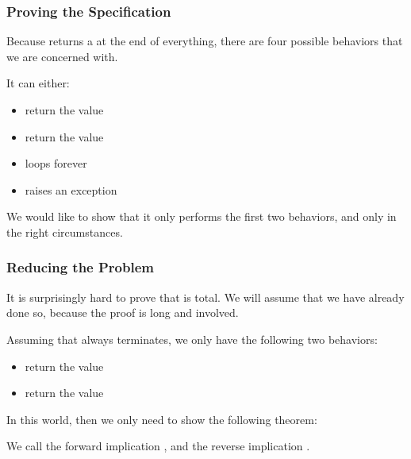 \documentclass[aspectratio=169, handout]{beamer}
\begin{document}
\begin{frame}[fragile]
  \frametitle{Proving the Specification}

  Because  returns a  at the end of everything, there
  are four possible behaviors that we are concerned with.

  \pause
  \vspace{\fill}

  It can either:
  \begin{itemize}
    \item return the value 
    \item return the value 
    \item loops forever
    \item raises an exception
  \end{itemize}

  \pause
  \vspace{\fill}

  We would like to show that it only performs the first two behaviors, and only
  in the right circumstances.
\end{frame}

\begin{frame}[fragile]
  \frametitle{Reducing the Problem}

  \ptmt

  It is surprisingly hard to prove that  is total. We will assume that
  we have already done so, because the proof is long and involved.

  \pause
  \vspace{\fill}


  \pause
  \vspace{\fill}

  Assuming that  always terminates, we only have the following
  two behaviors:
  \begin{itemize}
    \item return the value 
    \item return the value 
  \end{itemize}

  \pause
  \vspace{\fill}

  In this world, then we only need to show the following theorem:

  \vspace{5pt}

  \pause
  \vspace{\fill}

  We call the forward implication , and the reverse implication
  .
\end{frame}
\end{document}
